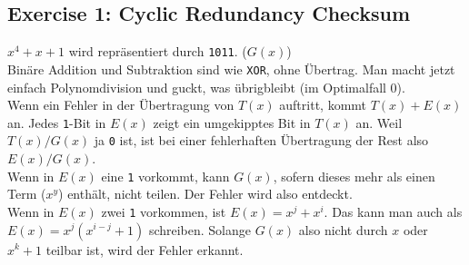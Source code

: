 \documentclass[10pt,a4paper]{scrartcl}
\begin{document}
\subsection*{Exercise 1: Cyclic Redundancy Checksum}
$x^4+x+1$ wird repräsentiert durch \texttt{1011}. ($G(x)$) \\
Binäre Addition und Subtraktion sind wie \texttt{XOR}, ohne Übertrag. Man macht jetzt einfach Polynomdivision und guckt, was übrigbleibt (im Optimalfall 0).\\
Wenn ein Fehler in der Übertragung von $T(x)$ auftritt, kommt $T(x)+E(x)$ an. Jedes \texttt{1}-Bit in $E(x)$ zeigt ein umgekipptes Bit in $T(x)$ an. Weil $T(x)/G(x)$ ja \texttt{0} ist, ist bei einer fehlerhaften Übertragung der Rest also $E(x)/G(x)$.\\
Wenn in $E(x)$ eine \texttt{1} vorkommt, kann $G(x)$, sofern dieses mehr als einen Term ($x^y$) enthält, nicht teilen. Der Fehler wird also entdeckt.\\
Wenn in $E(x)$ zwei \texttt{1} vorkommen, ist $E(x)=x^j+x^i$. Das kann man auch als $E(x)=x^j(x^{i-j}+1)$ schreiben. Solange $G(x)$ also nicht durch $x$ oder $x^k+1$ teilbar ist, wird der Fehler erkannt.
\end{document}
